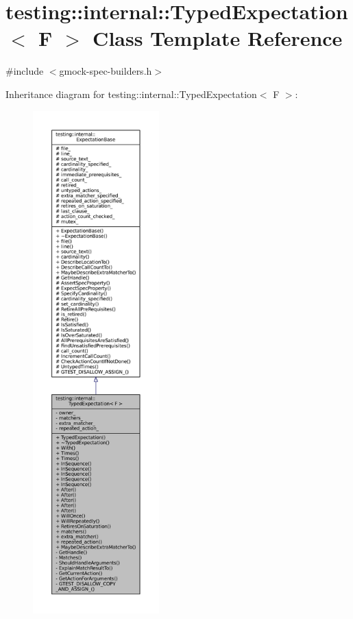 \hypertarget{classtesting_1_1internal_1_1TypedExpectation}{}\section{testing\+:\+:internal\+:\+:Typed\+Expectation$<$ F $>$ Class Template Reference}
\label{classtesting_1_1internal_1_1TypedExpectation}


{\ttfamily \#include $<$gmock-\/spec-\/builders.\+h$>$}



Inheritance diagram for testing\+:\+:internal\+:\+:Typed\+Expectation$<$ F $>$\+:
\nopagebreak
\begin{figure}[H]
\begin{center}
\leavevmode
\includegraphics[height=550pt]{classtesting_1_1internal_1_1TypedExpectation__inherit__graph}
\end{center}
\end{figure}


